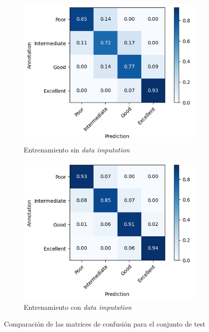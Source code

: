 \documentclass{article}
\begin{document}
		\begin{figure}[!h]
				\centering
     			\begin{subfigure}[b]{0.4\textwidth}
         			\centering
         			\includegraphics[scale=0.4]{cmtestsin.png}
         		\caption{Entrenamiento sin \textit{data imputation}}
         		\end{subfigure}
         		\hfill
     			\begin{subfigure}[b]{0.4\textwidth}
       				\centering
         			\includegraphics[scale=0.4]{cmtestcon.png}
         			\caption{Entrenamiento con \textit{data imputation}}
    		 	\end{subfigure}
    		 	\caption{Comparaci\'on de las matrices de confusi\'on para el conjunto de test}
    		 	\label{confusion-test}
			\end{figure}
			
\end{document}
